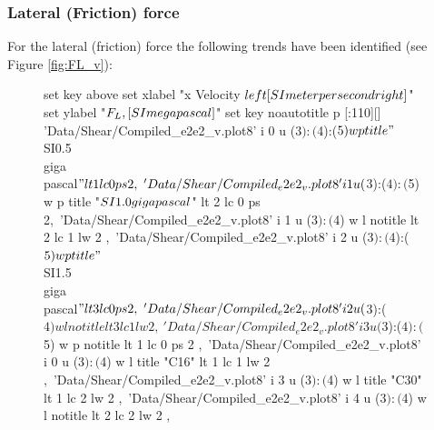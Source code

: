 \documentclass[aps,prb,reprint,superscriptaddress, a4paper]{revtex4-1}
\begin{document}

\subsubsection{Lateral (Friction) force}

For the lateral (friction) force the following trends have been identified (see Figure \ref{fig:FL_v}):

\begin{figure}
    	\begin{center}
		\begin{gnuplot}[terminal=pdf, terminaloptions={size \SERFigwidth cm, \SERFigheight cm color solid}]
			set key above
			set xlabel  "x Velocity $\\left[ \\SI{}{\\meter\\per\\second} \\right]$"  
			set ylabel "$F_L \\, [\\SI{}{\\mega\\pascal}]$"
			set key noautotitle
			p [:110][]	'Data/Shear/Compiled_e2e2_v.plot8' i 0 u ($3):($4):($5) w p title "$\\SI{0.5}{\\giga\\pascal}$" lt 1 lc 0 ps 2,\
				'Data/Shear/Compiled_e2e2_v.plot8' i 1 u ($3):($4):($5) w p title  "$\\SI{1.0}{\\giga\\pascal}$" lt 2 lc 0 ps 2,\
				'Data/Shear/Compiled_e2e2_v.plot8' i 1 u ($3):($4) w l notitle lt 2 lc 1  lw 2 ,\
				'Data/Shear/Compiled_e2e2_v.plot8' i 2 u ($3):($4):($5) w p title  "$\\SI{1.5}{\\giga\\pascal}$" lt 3 lc 0 ps 2,\
				'Data/Shear/Compiled_e2e2_v.plot8' i 2 u ($3):($4) w l notitle lt 3 lc 1 lw 2 ,\
				'Data/Shear/Compiled_e2e2_v.plot8' i 3 u ($3):($4):($5) w p notitle lt 1 lc 0 ps 2 ,\
				'Data/Shear/Compiled_e2e2_v.plot8' i 0 u ($3):($4) w l title "C16" lt 1 lc 1 lw 2 ,\
				'Data/Shear/Compiled_e2e2_v.plot8' i 3 u ($3):($4) w l title "C30" lt 1 lc 2 lw 2 ,\				
				'Data/Shear/Compiled_e2e2_v.plot8' i 4 u ($3):($4) w l notitle lt 2 lc 2 lw 2 ,\

\end{gnuplot}
\end{center}
\end{figure}
\end{document}
